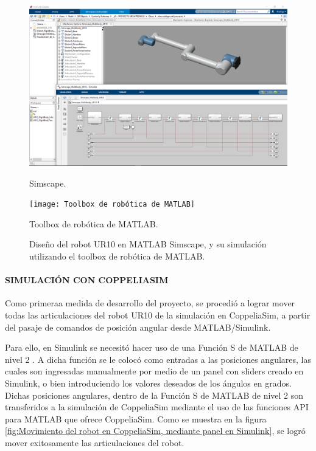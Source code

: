 \documentclass{article}
\begin{document}
\begin{sloppypar}
\begin{figure}[H]
    \centering
    \begin{minipage}{.5\textwidth}
        \centering
        \includegraphics[width=1\textwidth]{Simscape}
        \caption{Simscape.}
        \label{fig:Simscape}
    \end{minipage}%
    \begin{minipage}{.5\textwidth}
        \centering
        \texttt{[image: Toolbox de robótica de MATLAB]}
        \caption{Toolbox de robótica de MATLAB.}
        \label{fig:Toolbox de robótica de MATLAB}
    \end{minipage}
    \caption{Diseño del robot UR10 en MATLAB Simscape, y su simulación utilizando el toolbox de robótica de MATLAB.}
\end{figure}


\paragraph{SIMULACIÓN CON COPPELIASIM}
\label{sec:SIMULACIÓN CON COPPELIASIM}
\hfill

Como primeraa medida de desarrollo del proyecto, se procedió a lograr mover todas las articulaciones del robot UR10 de la simulación en CoppeliaSim, a partir del pasaje de comandos de posición angular desde MATLAB/Simulink.

Para ello, en Simulink se necesitó hacer uso de una Función S de MATLAB de nivel 2 \cite{Level-2_MATLAB_S-Functions}. A dicha función se le colocó como entradas a las posiciones angulares, las cuales son ingresadas manualmente por medio de un panel con sliders creado en Simulink, o bien introduciendo los valores deseados de los ángulos en grados. Dichas posiciones angulares, dentro de la Función S de MATLAB de nivel 2 son transferidos a la simulación de CoppeliaSim mediante el uso de las funciones API para MATLAB que ofrece CoppeliaSim. Como se muestra en la figura \ref{fig:Movimiento del robot en CoppeliaSim, mediante panel en Simulink}, se logró mover exitosamente las articulaciones del robot.



\end{sloppypar}
\end{document}
